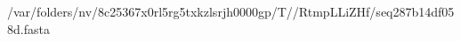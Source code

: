 \documentclass[10pt]{article}
\begin{document}
\begin{texshade}{/var/folders/nv/8c25367x0rl5rg5txkzlsrjh0000gp/T//RtmpLLiZHf/seq287b14df058d.fasta}
\hidelogoscale
\hidenames
{}
\end{texshade}
\end{document}
